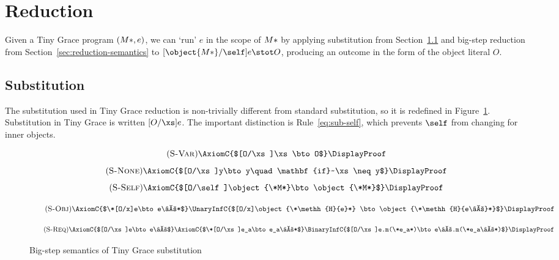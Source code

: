 \section{Reduction}\label{sec:reduction}

Given a Tiny Grace program $(\*M*, e)$, we can `run' $e$ in the scope of
$\*M*$ by applying substitution from Section~\ref{sec:substitution} and
big-step reduction from Section~\ref{sec:reduction-semantics} to
$[\object{\*M*}/\self]e \stot O$, producing an outcome in the form of the
object literal $O$.

\subsection{Substitution}\label{sec:substitution}

The substitution used in Tiny Grace reduction is non-trivially different from
standard substitution, so it is redefined in Figure~\ref{fig:substitution}.
Substitution in Tiny Grace is written $[O/\xs]e$. The important distinction is
Rule~\ref{eq:sub-self}, which prevents $\self$ from changing for inner objects.

\begin{figure}[h]
  \centering
  \newcommand{\name}[1]{\tag{\textsc{S-#1}}}
  \addtolength{\parskip}{-1em}

  \begin{equation}
    \name{Var}\label{eq:sub-var}
    \AxiomC{$[O/\xs]\xs\bto O$}
    \DisplayProof
  \end{equation}
%
  \begin{equation}
    \name{None}\label{eq:sub-none}
    \AxiomC{$[O/\xs]y\bto y\quad\mathbf{if}~\xs\neq y$}
    \DisplayProof
  \end{equation}
  \vspace{-.8em}
  \begin{equation}
    \name{Self}\label{eq:sub-self}
    \AxiomC{$[O/\self]\object{\*M*}\bto\object{\*M*}$}
    \DisplayProof
  \end{equation}

  \begin{equation}
    \name{Obj}\label{eq:sub-obj}
    \AxiomC{$\*[O/x]e\bto e\′*$}
    \UnaryInfC{$[O/x]\object{\*\methh{H}{e}*} \bto
      \object{\*\methh{H}{e\′}*}$}
    \DisplayProof
  \end{equation}

  \begin{equation}
    \name{Req}\label{eq:sub-req}
    \AxiomC{$[O/\xs]e\bto e\′$}
    \AxiomC{$\*[O/\xs]e_a\bto e_a\′*$}
    \BinaryInfC{$[O/\xs]e.m(\*e_a*)\bto e\′.m(\*e_a\′*)$}
    \DisplayProof
  \end{equation}

  \caption{Big-step semantics of Tiny Grace substitution}\label{fig:substitution}
\end{figure}

